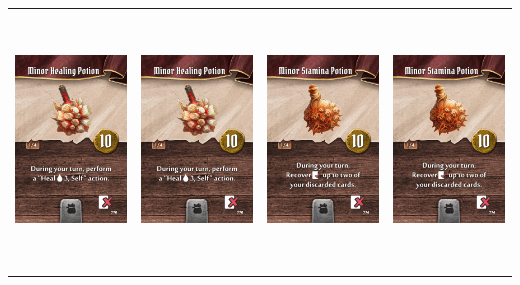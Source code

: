 \documentclass{minimal}
\begin{document}
{\begin{longtable}{llll}
\includegraphics[width=44mm,height=68mm]{./1-14/gh-012-minor-healing-potion.png} &
\includegraphics[width=44mm,height=68mm]{./1-14/gh-012-minor-healing-potion.png} &
\includegraphics[width=44mm,height=68mm]{./1-14/gh-013-minor-stamina-potion.png} &
\includegraphics[width=44mm,height=68mm]{./1-14/gh-013-minor-stamina-potion.png}\\ 

\end{longtable}}
\end{document}
